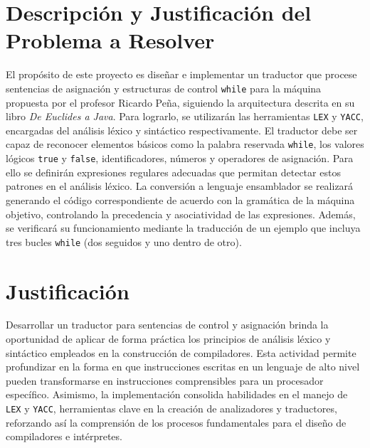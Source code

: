 \documentclass{article}
\begin{document}

\section{Descripción y Justificación del Problema a Resolver}\label{sec:descr}

El propósito de este proyecto es diseñar e implementar un traductor que procese sentencias de asignación y estructuras de control \texttt{while} para la máquina propuesta por el profesor Ricardo Peña, siguiendo la arquitectura descrita en su libro \textit{De Euclides a Java}. Para lograrlo, se utilizarán las herramientas \texttt{LEX} y \texttt{YACC}, encargadas del análisis léxico y sintáctico respectivamente. El traductor debe ser capaz de reconocer elementos básicos como la palabra reservada \texttt{while}, los valores lógicos \texttt{true} y \texttt{false}, identificadores, números y operadores de asignación. Para ello se definirán expresiones regulares adecuadas que permitan detectar estos patrones en el análisis léxico. La conversión a lenguaje ensamblador se realizará generando el código correspondiente de acuerdo con la gramática de la máquina objetivo, controlando la precedencia y asociatividad de las expresiones. Además, se verificará su funcionamiento mediante la traducción de un ejemplo que incluya tres bucles \texttt{while} (dos seguidos y uno dentro de otro).

\section*{Justificación}

Desarrollar un traductor para sentencias de control y asignación brinda la oportunidad de aplicar de forma práctica los principios de análisis léxico y sintáctico empleados en la construcción de compiladores. Esta actividad permite profundizar en la forma en que instrucciones escritas en un lenguaje de alto nivel pueden transformarse en instrucciones comprensibles para un procesador específico. Asimismo, la implementación consolida habilidades en el manejo de \texttt{LEX} y \texttt{YACC}, herramientas clave en la creación de analizadores y traductores, reforzando así la comprensión de los procesos fundamentales para el diseño de compiladores e intérpretes.
\end{document}
